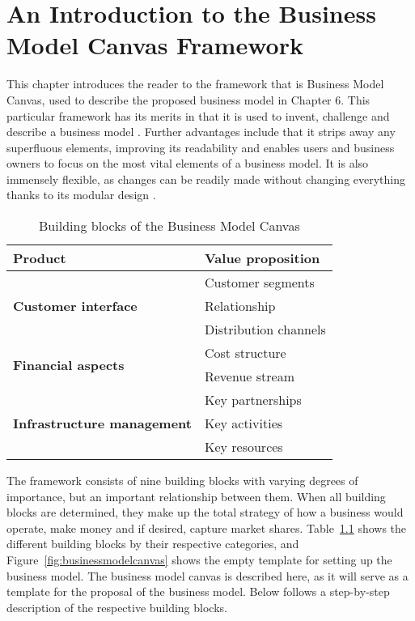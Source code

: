 \chapter{An Introduction to the Business Model Canvas Framework}

This chapter introduces the reader to the framework that is Business Model Canvas, used to describe the proposed business model in Chapter 6. This particular framework has its merits in that it is used to invent, challenge and describe a business model \cite{strategyzer2016}. Further advantages include that it strips away any superfluous elements, improving its readability and enables users and business owners to focus on the most vital elements of a business model. It is also immensely flexible, as changes can be readily made without changing everything thanks to its modular design \cite{osterwalder2013business}. 


\begin{table}[H]
\centering
\caption{Building blocks of the Business Model Canvas}
\label{tab:canvas}
\begin{tabular}{|l|l|}
\hline
\textbf{Product}                                    & Value proposition     \\ \hline
\multirow{3}{*}{\textbf{Customer interface}}        & Customer segments     \\ \cline{2-2} 
                                                    & Relationship          \\ \cline{2-2} 
                                                    & Distribution channels \\ \hline
\multirow{2}{*}{\textbf{Financial aspects}}         & Cost structure        \\ \cline{2-2} 
                                                    & Revenue stream        \\ \hline
\multirow{3}{*}{\textbf{Infrastructure management}} & Key partnerships      \\ \cline{2-2} 
                                                    & Key activities        \\ \cline{2-2} 
                                                    & Key resources         \\ \hline
\end{tabular}
\end{table}

The framework consists of nine building blocks with varying degrees of importance, but an important relationship between them. When all building blocks are determined, they make up the total strategy of how a business would operate, make money and if desired, capture market shares. Table~\ref{tab:canvas} shows the different building blocks by their respective categories, and Figure~\ref{fig:businessmodelcanvas} shows the empty template for setting up the business model. The business model canvas is described here, as it will serve as a template for the proposal of the business model. Below follows a step-by-step description of the respective building blocks.



